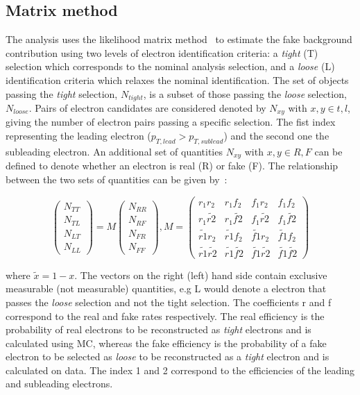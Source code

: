 \subsection{Matrix method}
The analysis uses the likelihood matrix method~\cite{Varnes:2016nrb} to estimate the fake background contribution using two levels of electron identification criteria: a \emph{tight} (T) selection which corresponds to the nominal analysis selection, and a \emph{loose} (L) identification criteria which relaxes the nominal identification. The set of objects passing the \emph{tight} selection, $N_{tight}$, is a subset of those passing the \emph{loose} selection, $N_{loose}$. Pairs of electron candidates are considered denoted by $N_{xy}$ with $x,y \in t,l$, giving the number of electron pairs passing a specific selection. The fist index representing the leading electron ($p_{T,lead} > p_{T,sublead}$) and the second one the subleading electron. An additional set of quantities $N_{xy}$ with $x,y \in R,F$ can be defined to denote whether an electron is real (R) or fake (F). The relationship between the two sets of quantities can be given by~\cite{EXOT-2016-05}:

\begin{equation}\label{eq:matrix_method_1}
\left(\begin{array}{c}N_{TT}\\ N_{TL}\\ N_{LT}\\ N_{LL}\end{array}\right) = M \left(\begin{array}{c}N_{RR}\\ N_{RF}\\ N_{FR}\\ N_{FF}\end{array}\right) , M =
    \begin{pmatrix}
    r_1r_2 & r_1f_2 &  f_1r_2 & f_1f_2\\
    r_1\tilde{r2} & r_1\tilde{f2} & f_1\tilde{r2} & f_1\tilde{f2}\\
    \tilde{r1}r_2 & \tilde{r1}f_2 & \tilde{f1}r_2 & \tilde{f1}f_2\\
    \tilde{r1}\tilde{r2} & \tilde{r1}\tilde{f2} & \tilde{f1}\tilde{r2} & \tilde{f1}\tilde{f2}  
    \end{pmatrix}
\end{equation}

where $\tilde{x} = 1 - x$. The vectors on the right (left) hand side contain exclusive measurable (not measurable) quantities, e.g L would denote a electron that passes the \emph{loose} selection and not the tight selection. The coefficients r and f correspond to the real and fake rates respectively. The real efficiency is the probability of real electrons to be reconstructed as \emph{tight} electrons and is calculated using MC, whereas the fake efficiency is the probability of a fake electron to be selected as \emph{loose} to be reconstructed as a \emph{tight} electron and is calculated on data. The index 1 and 2 correspond to the efficiencies of the leading and subleading electrons. 

